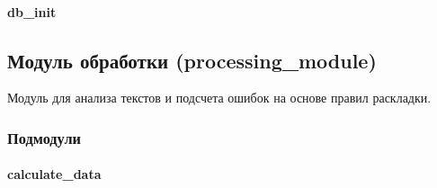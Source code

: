 \documentclass[a4paper,11pt,russian,openany,oneside]{sphinxmanual}
\begin{document}
\paragraph{db\_init}
\label{\detokenize{database_module:db-init}}
\sphinxstepscope


\subsection{Модуль обработки (processing\_module)}
\label{\detokenize{processing_module:processing-module}}\label{\detokenize{processing_module::doc}}
\sphinxAtStartPar
Модуль для анализа текстов и подсчета ошибок на основе правил раскладки.

\subsubsection{Подмодули}
\label{\detokenize{processing_module:module-processing_module}}\label{\detokenize{processing_module:id1}}

\paragraph{calculate\_data}
\label{\detokenize{processing_module:module-processing_module.calculate_data}}\label{\detokenize{processing_module:calculate-data}}
\end{document}
